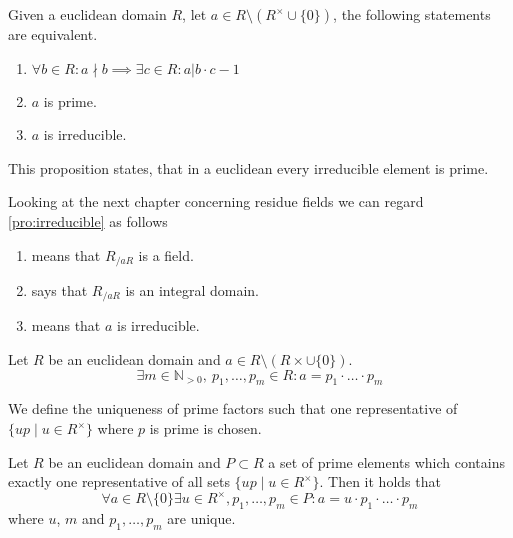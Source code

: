 \begin{proposition}\label{pro:irreducible}
   Given a euclidean domain \(R\), let \(a \in R \setminus (R^\times \cup \{0\})\), the following statements are equivalent.
   \begin{enumerate}[label=\roman*, align=Center]
      \item \(\forall b \in R: a \nmid b \implies \exists c \in R: a | b \cdot c - 1\)
      \item \(a\) is prime.
      \item \(a\) is irreducible.
   \end{enumerate}
\end{proposition}
\begin{remark}
   This proposition states, that in a euclidean every irreducible element is prime.
\end{remark}
\begin{remark}
   Looking at the next chapter concerning residue fields we can regard \cref{pro:irreducible} as follows
   \begin{enumerate}[label=\roman*, align=Center]
      \item means that \(R_{/aR}\) is a field.
      \item says that \(R_{/aR}\) is an integral domain.
      \item means that \(a\) is irreducible.
   \end{enumerate}
\end{remark}

\begin{lemma}\label{lem:factorization}
   Let \(R\) be an euclidean domain and \(a \in R \setminus (R\times \cup \{0\})\).
   \[\exists m \in \mathbb{N}_{>0},~p_1, \ldots, p_m \in R: a = p_1 \cdot \ldots \cdot p_m\]
\end{lemma}
\begin{remark}
   We define the uniqueness of prime factors such that one representative of \(\{up \mid u \in R^\times\}\) where \(p\) is prime is chosen.
\end{remark}

\begin{proposition}
   Let \(R\) be an euclidean domain and \(P \subset R\) a set of prime elements which contains exactly one representative of all sets \(\{up \mid u \in R^\times\}\).
   Then it holds that
   \[\forall a \in R \setminus \{0\} \exists u \in R^\times, p_1, \ldots, p_m \in P: a = u \cdot p_1 \cdot \ldots \cdot p_m\]
   where \(u\), \(m\) and \(p_1, \ldots, p_m\) are unique.
\end{proposition}

